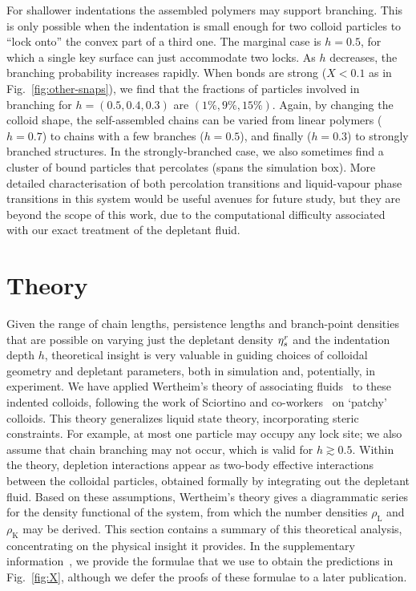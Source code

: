 \documentclass[10pt,onside,singlecolumn]{article}
\newcommand{\rhoL}{\rho_\mathrm{L}}
\newcommand{\rhoK}{\rho_\mathrm{K}}
\begin{document}
For shallower indentations the assembled polymers may support
branching.  This is only possible when the indentation is 
small enough for two colloid particles to
``lock
onto'' the convex part of a third one.  The marginal case is
$h=0.5$, for which a single key surface can just accommodate
two locks.  As $h$ decreases, the branching probability increases
rapidly.  When bonds are strong ($X<0.1$ as in
Fig.~\ref{fig:other-snaps}), we find that the fractions of particles
involved in branching for $h=(0.5,0.4,0.3)$ are $(1\%, 9\%,15\%)$.
Again, by changing the colloid shape, the self-assembled chains can be
varied from linear polymers ($h=0.7$) to chains with a few
branches ($h=0.5$), and finally ($h=0.3$) to strongly
branched structures.  In the strongly-branched case, we also sometimes find a cluster of bound particles that 
percolates (spans the simulation box).  More detailed characterisation of both percolation
transitions and liquid-vapour phase transitions in this system would be useful avenues for
future study, but they are beyond the scope of this work, due to the computational difficulty
associated with our exact treatment of the depletant fluid.

\section{Theory} \label{sec:theory}

Given the range of chain lengths, persistence lengths and branch-point densities that are
 possible on varying just the
depletant density $\eta_s^r$ and the indentation depth $h$, theoretical
insight is very valuable in guiding choices of colloidal geometry and
depletant parameters, both in simulation and, potentially, in
experiment.  We have applied Wertheim's theory of associating
fluids~\cite{Wertheim} to these indented colloids, following the work
of Sciortino and co-workers~\cite{Bianchi06,Sciortino2007} on `patchy'
colloids.  This theory generalizes liquid state theory, incorporating
steric constraints.  For example,
at most one particle may occupy any lock site; we also assume that
chain branching may not occur, which is valid for $h\gtrsim 0.5$. 
Within the theory, depletion interactions appear as two-body effective interactions
between the colloidal particles, obtained formally by integrating out
the depletant fluid.  Based on these assumptions, Wertheim's theory
gives a diagrammatic series for the density functional of the system,
from which the number densities $\rhoL$ and $\rhoK$ may be derived.
%
This section contains a summary of this theoretical analysis, concentrating on the physical
insight it provides.  In the supplementary information~\cite{SI}, we
provide the formulae that we use to obtain the predictions in Fig.~\ref{fig:X}, although 
we defer the proofs of these formulae to a later publication.
\end{document}
